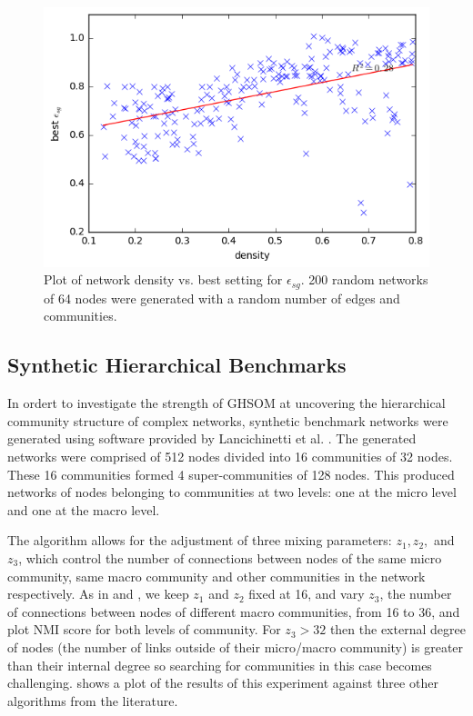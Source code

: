 \documentclass{article}
\begin{document}
\begin{figure}
\includegraphics[scale=0.65]{derived_results.png}
\caption{Plot of network density vs. best setting for $\epsilon_{sg}$. 200 random networks of 64 nodes were generated with a random number of edges and communities.}
\end{figure}

\subsection{Synthetic Hierarchical Benchmarks}
In ordert to investigate the strength of GHSOM at uncovering the hierarchical community structure of complex networks, synthetic benchmark networks were generated using software provided by Lancichinetti et al. \cite{lancichinetti2009detecting}. 
The generated networks were comprised of 512 nodes divided into 16 communities of 32 nodes. 
These 16 communities formed 4 super-communities of 128 nodes. 
This produced networks of nodes belonging to communities at two levels: one at the micro level and one at the macro level.

The algorithm allows for the adjustment of three mixing parameters: $z_1, z_2,$ and $z_3$, which control the number of connections between nodes of the same micro community, same macro community and other communities in the network respectively. 
As in \cite{lancichinetti2009detecting} and \cite{yang2013hierarchical}, we keep $z_1$ and $z_2$ fixed at 16, and vary $z_3$, the number of connections between nodes of different macro communities, from 16 to 36, and plot NMI score for both levels of community. 
For $z_3 > 32$ then the external degree of nodes (the number of links outside of their micro/macro community) is greater than their internal degree so searching for communities in this case becomes challenging. 
 shows a plot of the results of this experiment against three other algorithms from the literature. 
\end{document}

